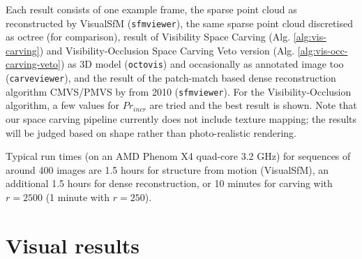 Each result consists of one example frame, the sparse point cloud as reconstructed by VisualSfM (\texttt{sfmviewer}), the same sparse point cloud discretised as octree (for comparison), result of Visibility Space Carving (Alg. \ref{alg:vis-carving}) and Visibility-Occlusion Space Carving Veto version (Alg. \ref{alg:vis-occ-carving-veto}) as 3D model (\texttt{octovis}) and occasionally as annotated image too (\texttt{carveviewer}), and the result of the patch-match based dense reconstruction algorithm CMVS/PMVS by  from 2010 (\texttt{sfmviewer}). For the Visibility-Occlusion algorithm, a few values for $Pr_{incr}$ are tried and the best result is shown. Note that our space carving pipeline currently does not include texture mapping; the results will be judged based on shape rather than photo-realistic rendering.

Typical run times (on an AMD Phenom X4 quad-core 3.2 GHz) for sequences of around 400 images are 1.5 hours for structure from motion (VisualSfM), an additional 1.5 hours for dense reconstruction, or 10 minutes for carving with $r=2500$ (1 minute with $r=250$). 

\section{Visual results}

